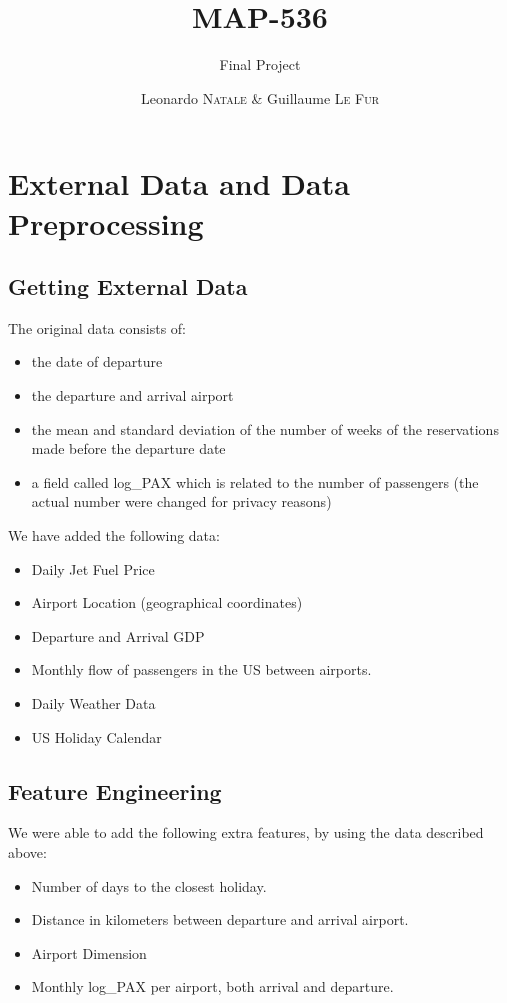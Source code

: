 \documentclass[a4paper,12pt,twoside]{article}
\title{MAP-536}
\subtitle{Final Project}
\author{Leonardo \textsc{Natale} \& Guillaume \textsc{Le Fur}}
\begin{document}
\maketitle

\section{External Data and Data Preprocessing}

\subsection{Getting External Data}
The original data consists of:
\begin{itemize}
	\item the date of departure
	\item the departure and arrival airport
	\item the mean and standard deviation of the number of weeks of the reservations made before the departure date
    \item a field called log\_PAX which is related to the number of passengers (the actual number were changed for privacy reasons)
\end{itemize}
We have added the following data:
\begin{itemize}
	\item Daily Jet Fuel Price
	\item Airport Location (geographical coordinates)
	\item Departure and Arrival GDP
	\item Monthly flow of passengers in the US between airports.
	\item Daily Weather Data
	\item US Holiday Calendar
\end{itemize}

\subsection{Feature Engineering}

We were able to add the following extra features, by using the data described above:
\begin{itemize}
	\item Number of days to the closest holiday.
	\item Distance in kilometers between departure and arrival airport.
	\item Airport Dimension
	\item Monthly log\_PAX per airport, both arrival and departure.
\end{itemize}
\end{document}
